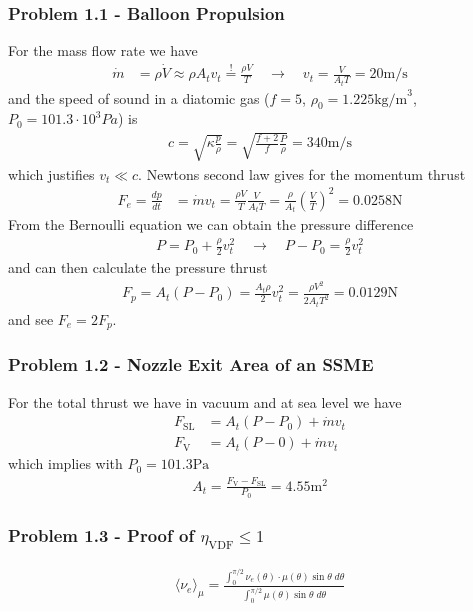 \documentclass[10pt,a4paper]{book}
\theoremstyle{definition}
\begin{document}
\subsubsection{Problem 1.1 - Balloon Propulsion}
For the mass flow rate we have
\begin{align}
    \dot{m}&=\rho\dot{V}\approx\rho A_t v_t \stackrel{!}{=} \frac{\rho V}{T}\quad\rightarrow\quad v_t=\frac{V}{A_tT}=20\text{m/s}
\end{align}
and the speed of sound in a diatomic gas ($f=5$, $\rho_0=1.225\text{kg/m}^3$, $P_0=101.3\cdot10^3Pa$) is
\begin{align}
    c=\sqrt{\kappa\frac{p}{\rho}}=\sqrt{\frac{f+2}{f}\frac{P}{\rho}}=340\text{m/s}
\end{align}
which justifies $v_t\ll c$. Newtons second law gives for the momentum thrust
\begin{align}
    F_e=\frac{dp}{dt}&=\dot{m}v_t=\frac{\rho V}{T}\frac{V}{A_t T}=\frac{\rho}{A_t}\left(\frac{V}{T}\right)^2=0.0258\text{N}
\end{align}
From the Bernoulli equation we can obtain the pressure difference
\begin{align}
    P = P_0+\frac{\rho}{2}v_t^2\quad\rightarrow\quad P - P_0=\frac{\rho}{2}v_t^2
\end{align}
and can then calculate the pressure thrust
\begin{align}
    F_p=A_t(P-P_0)=\frac{A_t\rho}{2}v_t^2=\frac{\rho V^2}{2A_tT^2}=0.0129\text{N}
\end{align}
and see $F_e=2F_p$.


\subsubsection{Problem 1.2 - Nozzle Exit Area of an SSME}
For the total thrust we have in vacuum and at sea level we have
\begin{align}
    F_\text{SL}&=A_t(P-P_0) + \dot{m}v_t\\
    F_\text{V}&=A_t(P-0) + \dot{m}v_t
\end{align}
which implies with $P_0=101.3\text{Pa}$
\begin{align}
    A_t=\frac{F_\text{V}-F_\text{SL}}{P_0}=4.55\text{m}^2
\end{align}


\subsubsection{Problem 1.3 - Proof of \texorpdfstring{$\eta_\text{VDF}\le1$}{Lg} }
\begin{align}
    \langle \nu_e\rangle_\mu=\frac{\int_0^{\pi/2}\nu_e(\theta)\cdot\mu(\theta)\sin\theta\;d\theta}{\int_0^{\pi/2}\mu(\theta)\sin\theta\;d\theta}
\end{align}
\end{document}
